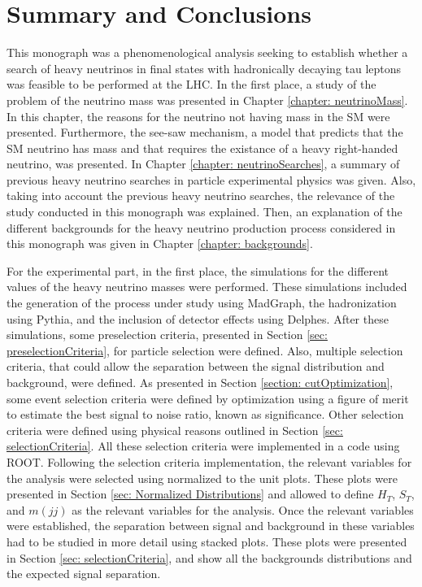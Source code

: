 \chapter{Summary and Conclusions}\label{chapter: conclusions}

This monograph was a phenomenological analysis seeking to establish whether a search of heavy neutrinos in final states with hadronically decaying tau leptons was feasible to be performed at the LHC. In the first place, a study of the problem of the neutrino mass was presented in Chapter \ref{chapter: neutrinoMass}. In this chapter, the reasons for the neutrino not having mass in the SM were presented. Furthermore, the see-saw mechanism, a model that predicts that the SM neutrino has mass and that requires the existance of a heavy right-handed neutrino, was presented. In Chapter \ref{chapter: neutrinoSearches}, a summary of previous heavy neutrino searches in particle experimental physics was given. Also, taking into account the previous heavy neutrino searches, the relevance of the study conducted in this monograph was explained. Then, an explanation of the different backgrounds for the heavy neutrino production process considered in this monograph was given in Chapter \ref{chapter: backgrounds}.

For the experimental part, in the first place, the simulations for the different values of the heavy neutrino masses were performed. These simulations included the generation of the process under study using MadGraph, the hadronization using Pythia, and the inclusion of detector effects using Delphes. After these simulations, some preselection criteria, presented in Section \ref{sec: preselectionCriteria}, for particle selection were defined. Also, multiple selection criteria, that could allow the separation between the signal distribution and background, were defined. As presented in Section \ref{section: cutOptimization}, some event selection criteria were defined by optimization using a figure of merit to estimate the best signal to noise ratio, known as significance. Other selection criteria were defined using physical reasons outlined in Section \ref{sec: selectionCriteria}. All these selection criteria were implemented in a code using ROOT. Following the selection criteria implementation, the relevant variables for the analysis were selected using normalized to the unit plots. These plots were presented in Section \ref{sec: Normalized Distributions} and allowed to define $H_{T}$, $S_{T}$, and $m(jj)$ as the relevant variables for the analysis. Once the relevant variables were established, the separation between signal and background in these variables had to be studied in more detail using stacked plots. These plots were presented in Section \ref{sec: selectionCriteria}, and show all the backgrounds distributions and the expected signal separation.

